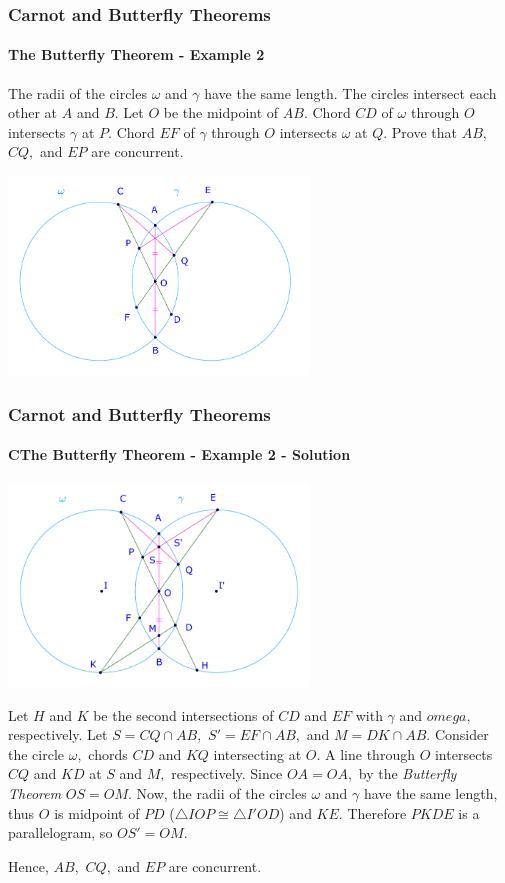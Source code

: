 \documentclass[8pt,xcolor=table,dvipsnames]{beamer}
\begin{document}
\begin{frame}[t]
    \frametitle{Carnot and Butterfly Theorems}
    \framesubtitle{The Butterfly Theorem - Example 2}
    \begin{example}
        The radii of the circles $\omega$ and $\gamma$ have the same length. The circles intersect each other at $A$ and $B.$
        Let $O$ be the midpoint of $AB.$ Chord $CD$ of $\omega$ through $O$ intersects $\gamma$ at $P.$
        Chord $EF$ of $\gamma$ through $O$ intersects $\omega$ at $Q.$
        Prove that $AB,$ $CQ,$ and $EP$ are concurrent.
    \end{example}

    \bigbreak
    \begin{center}
        \includegraphics[width=8cm]{./svg/pdf/24-25-s2-g3-p6.pdf}
    \end{center}
\end{frame}

\begin{frame}[t]
    \frametitle{Carnot and Butterfly Theorems}
    \framesubtitle{CThe Butterfly Theorem - Example 2 - Solution}
    \begin{center}
        \includegraphics[width=8cm]{./svg/pdf/24-25-s2-g3-p6-2.pdf}
    \end{center}
    \begin{overprint}
        Let $H$ and $K$ be the second intersections of $CD$ and $EF$ with $\gamma$ and $omega,$ respectively.
        Let $S = CQ \cap AB,$ $S' = EF \cap AB,$ and $M = DK \cap AB.$
        Consider the circle $\omega,$ chords $CD$ and $KQ$ intersecting at $O.$ A line through $O$ intersects $CQ$ and $KD$ at $S$ and $M,$ respectively.
        Since $OA = OA,$ by the \textit{Butterfly Theorem} $OS = OM.$ 
        Now, the radii of the circles $\omega$ and $\gamma$ have the same length,
        thus $O$ is midpoint of $PD$ ($\triangle IOP \cong \triangle I'OD$) and $KE.$
        Therefore $PKDE$ is a parallelogram, so $OS' = OM.$
        
        Hence, $AB,$ $CQ,$ and $EP$ are concurrent.
    \end{overprint}        
\end{frame}
\end{document}
